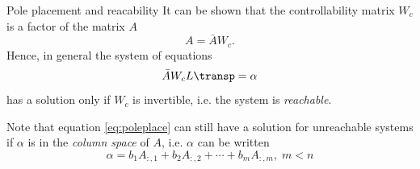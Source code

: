 \documentclass[presentation,aspectratio=1610]{beamer}
\begin{document}
\begin{frame}[label={sec:orgbbecfc2}]{Pole placement and reacability}
It can be shown that the controllability matrix \(W_c\) is a factor of the matrix \(A\)
\[ A = \bar{A} W_c. \] Hence, in general the system of equations
\begin{equation}
\bar{A}W_c L\transp = \alpha
\label{eq:poleplace}
\end{equation}
has a solution only if \(W_c\) is invertible, i.e. the system is \emph{reachable}.

Note that equation \eqref{eq:poleplace} can still have a solution for unreachable systems if \alert{\(\alpha\) is in the \emph{column space} of \(A\)}, i.e. \(\alpha\) can be written
\[ \alpha = b_1 A_{:,1} + b_2A_{:,2} + \cdots + b_mA_{:,m}, \; m < n \]
\end{frame}
\end{document}
